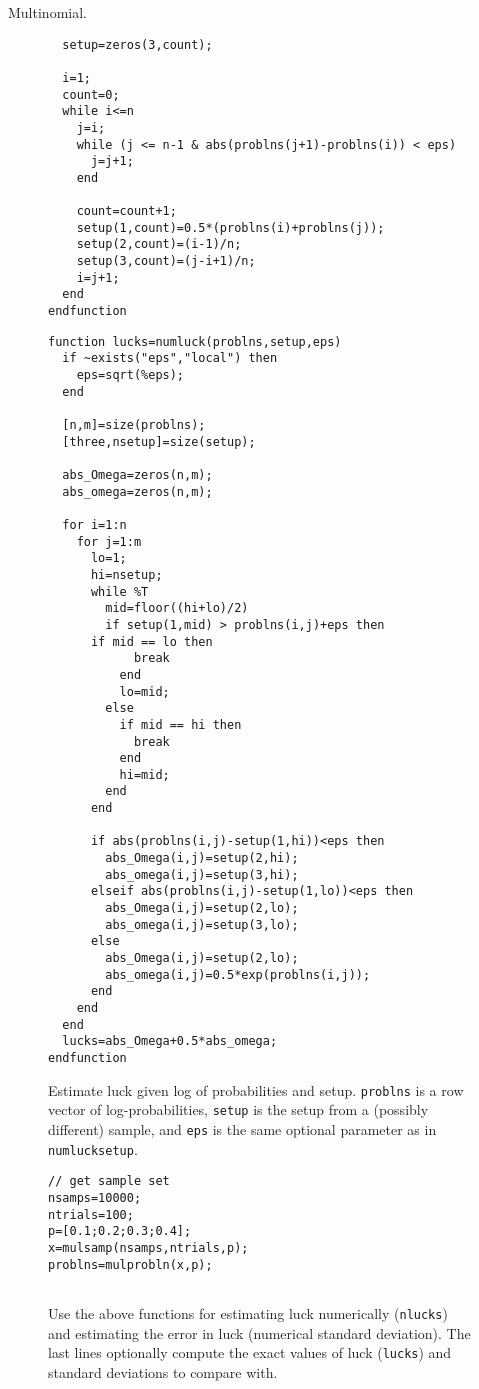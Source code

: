 \begin{example}{Multinomial.}
\begin{figure}
\begin{lstlisting}
  setup=zeros(3,count);

  i=1;
  count=0;
  while i<=n
    j=i;
    while (j <= n-1 & abs(problns(j+1)-problns(i)) < eps)  
      j=j+1;
    end

    count=count+1;
    setup(1,count)=0.5*(problns(i)+problns(j));
    setup(2,count)=(i-1)/n;
    setup(3,count)=(j-i+1)/n;
    i=j+1;
  end
endfunction
\end{lstlisting}
\end{figure}

\begin{figure}
\caption{\label{fig:numluck}Estimate luck given log of probabilities and setup.  {\tt problns} is a row vector of log-probabilities, {\tt setup} is the setup from a (possibly different) sample, and {\tt eps} is the same optional parameter as in {\tt numlucksetup}.}
\lstset{language=Scilab}
\begin{lstlisting}
function lucks=numluck(problns,setup,eps)
  if ~exists("eps","local") then
    eps=sqrt(%eps);
  end

  [n,m]=size(problns);
  [three,nsetup]=size(setup);

  abs_Omega=zeros(n,m);
  abs_omega=zeros(n,m);

  for i=1:n
    for j=1:m
      lo=1;
      hi=nsetup;
      while %T
        mid=floor((hi+lo)/2)
        if setup(1,mid) > problns(i,j)+eps then
   	  if mid == lo then
            break
          end
          lo=mid;
        else
          if mid == hi then
            break
          end
          hi=mid;
        end
      end

      if abs(problns(i,j)-setup(1,hi))<eps then
        abs_Omega(i,j)=setup(2,hi);
        abs_omega(i,j)=setup(3,hi);
      elseif abs(problns(i,j)-setup(1,lo))<eps then
        abs_Omega(i,j)=setup(2,lo);
        abs_omega(i,j)=setup(3,lo);
      else
        abs_Omega(i,j)=setup(2,lo);
        abs_omega(i,j)=0.5*exp(problns(i,j));
      end
    end
  end
  lucks=abs_Omega+0.5*abs_omega;
endfunction
\end{lstlisting}
\end{figure}

\begin{figure}
\caption{\label{fig:numluckprog}Use the above functions for estimating luck numerically ({\tt nlucks}) and estimating the error in luck (numerical standard deviation).  The last lines optionally compute the exact values of luck ({\tt lucks}) and standard deviations to compare with.}
\lstset{language=Scilab}
\begin{lstlisting}
// get sample set
nsamps=10000;
ntrials=100;
p=[0.1;0.2;0.3;0.4];
x=mulsamp(nsamps,ntrials,p);
problns=mulprobln(x,p);


\end{lstlisting}
\end{figure}
\end{example}

